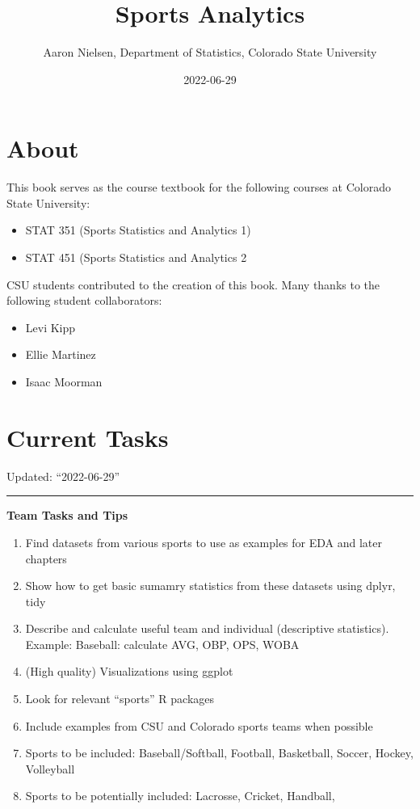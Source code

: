 \documentclass[
  11pt,
]{book}
\title{Sports Analytics}
\author{Aaron Nielsen, Department of Statistics, Colorado State University}
\date{2022-06-29}
\providecommand{\tightlist}{%
  \setlength{\itemsep}{0pt}\setlength{\parskip}{0pt}}
\theoremstyle{definition}
\theoremstyle{definition}
\theoremstyle{definition}
\theoremstyle{definition}
\theoremstyle{remark}
\begin{document}
\maketitle

{
\setcounter{tocdepth}{1}
\tableofcontents
}
\hypertarget{about}{%
\chapter*{About}\label{about}}

This book serves as the course textbook for the following courses at Colorado State University:

\begin{itemize}
\item
  STAT 351 (Sports Statistics and Analytics 1)
\item
  STAT 451 (Sports Statistics and Analytics 2
\end{itemize}

\hfill\break

CSU students contributed to the creation of this book. Many thanks to the following student collaborators:

\begin{itemize}
\item
  Levi Kipp
\item
  Ellie Martinez
\item
  Isaac Moorman
\end{itemize}

\hypertarget{current-tasks}{%
\chapter*{Current Tasks}\label{current-tasks}}

Updated: ``2022-06-29''

\begin{center}\rule{0.5\linewidth}{0.5pt}\end{center}

\textbf{Team Tasks and Tips}

\begin{enumerate}
\def\labelenumi{\arabic{enumi}.}
\tightlist
\item
  Find datasets from various sports to use as examples for EDA and later chapters
\item
  Show how to get basic sumamry statistics from these datasets using dplyr, tidy
\item
  Describe and calculate useful team and individual (descriptive statistics). Example: Baseball: calculate AVG, OBP, OPS, WOBA
\item
  (High quality) Visualizations using ggplot
\item
  Look for relevant ``sports'' R packages
\item
  Include examples from CSU and Colorado sports teams when possible
\item
  Sports to be included: Baseball/Softball, Football, Basketball, Soccer, Hockey, Volleyball
\item
  Sports to be potentially included: Lacrosse, Cricket, Handball,
\end{enumerate}
\end{document}
